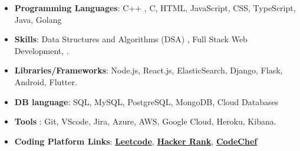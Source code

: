 
\begin{itemize}
\item \textbf{\color{black}Programming Languages}: C++ , C, HTML, JavaScript, CSS, TypeScript, Java, Golang
\end{itemize}
\begin{itemize}
\item \textbf{\color{black}Skills}: Data Structures and Algorithms (DSA) , Full Stack Web Development, .
\end{itemize}
\begin{itemize}
\item \textbf{\color{black}Libraries/Frameworks}: Node.js, React.js, ElasticSearch, Django, Flask, Android, Flutter.
\end{itemize}
\begin{itemize}
\item \textbf{\color{black}DB language}: SQL, MySQL, PostgreSQL, MongoDB, Cloud Databases 
\end{itemize}
\begin{itemize}
\item \textbf{\color{black}Tools} : Git, VScode, Jira, Azure, AWS, Google Cloud, Heroku, Kibana.
\end{itemize}
\begin{itemize}
    \item \textbf{\color{black}Coding Platform Links}: \href{https://www.leetcode.com/pratyushraj2fastandfurious/}{\color{black}\textbf{Leetcode}}, \href{https://www.hackerrank.com/2rajpratyush/}{\color{black} \textbf{Hacker Rank}},  {\href{http://www.codechef.com/users/rajpratyush23/}{\color{black}\textbf{CodeChef}}}
\end{itemize}



